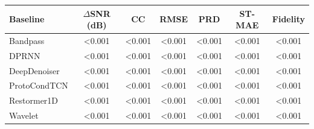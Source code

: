 \begin{tabular}{lcccccc}
\toprule
Baseline & $\Delta$SNR (dB) & CC & RMSE & PRD & ST-MAE & Fidelity \\
\midrule
Bandpass & <0.001 & <0.001 & <0.001 & <0.001 & <0.001 & <0.001 \\
DPRNN & <0.001 & <0.001 & <0.001 & <0.001 & <0.001 & <0.001 \\
DeepDenoiser & <0.001 & <0.001 & <0.001 & <0.001 & <0.001 & <0.001 \\
ProtoCondTCN & <0.001 & <0.001 & <0.001 & <0.001 & <0.001 & <0.001 \\
Restormer1D & <0.001 & <0.001 & <0.001 & <0.001 & <0.001 & <0.001 \\
Wavelet & <0.001 & <0.001 & <0.001 & <0.001 & <0.001 & <0.001 \\
\bottomrule
\end{tabular}
